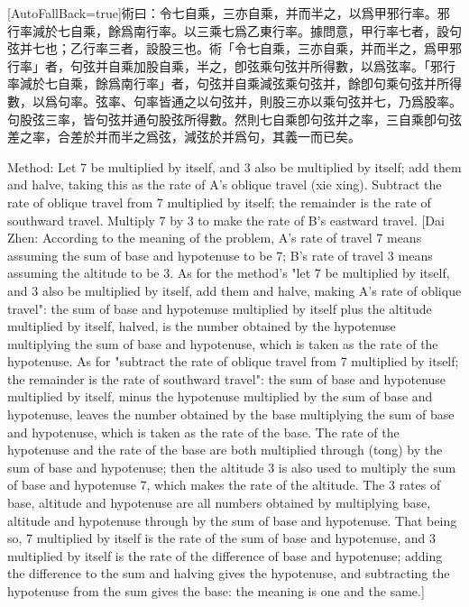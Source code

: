 \documentclass[11pt]{article}
\newcommand{\zhsmall}{\footnotesize\color{black!70}}
\newcommand{\unitlabel}[1]{\marginpar{\raggedleft\tiny\color{gray}#1}}
\newenvironment{unitzh}{\par\CJKfontspec{Noto Serif CJK SC}[AutoFallBack=true]\large\linespread{1.25}\selectfont}{\par}
\newenvironment{uniten}{\par\small\color{black!85}}{\par\medskip}
\begin{document}
\begin{unitzh}\unitlabel{jiuzhang-041.21}術曰：令七自乘，三亦自乘，并而半之，以爲甲邪行率。邪行率減於七自乘，餘爲南行率。以三乘七爲乙東行率。{\zhsmall 據問意，甲行率七者，設句弦并七也；乙行率三者，設股三也。術「令七自乘，三亦自乘，并而半之，爲甲邪行率」者，句弦并自乘加股自乘，半之，卽弦乘句弦并所得數，以爲弦率。「邪行率減於七自乘，餘爲南行率」者，句弦并自乘減弦乘句弦并，餘卽句乘句弦并所得數，以爲句率。弦率、句率皆通之以句弦并，則股三亦以乘句弦并七，乃爲股率。句股弦三率，皆句弦并通句股弦所得數。然則七自乘卽句弦并之率，三自乘卽句弦差之率，合差於并而半之爲弦，減弦於并爲句，其義一而已矣。}\end{unitzh}
\begin{uniten}Method: Let 7 be multiplied by itself, and 3 also be multiplied by itself; add them and halve, taking this as the rate of A's oblique travel (xie xing). Subtract the rate of oblique travel from 7 multiplied by itself; the remainder is the rate of southward travel. Multiply 7 by 3 to make the rate of B's eastward travel. [Dai Zhen: According to the meaning of the problem, A's rate of travel 7 means assuming the sum of base and hypotenuse to be 7; B's rate of travel 3 means assuming the altitude to be 3. As for the method's "let 7 be multiplied by itself, and 3 also be multiplied by itself, add them and halve, making A's rate of oblique travel": the sum of base and hypotenuse multiplied by itself plus the altitude multiplied by itself, halved, is the number obtained by the hypotenuse multiplying the sum of base and hypotenuse, which is taken as the rate of the hypotenuse. As for "subtract the rate of oblique travel from 7 multiplied by itself; the remainder is the rate of southward travel": the sum of base and hypotenuse multiplied by itself, minus the hypotenuse multiplied by the sum of base and hypotenuse, leaves the number obtained by the base multiplying the sum of base and hypotenuse, which is taken as the rate of the base. The rate of the hypotenuse and the rate of the base are both multiplied through (tong) by the sum of base and hypotenuse; then the altitude 3 is also used to multiply the sum of base and hypotenuse 7, which makes the rate of the altitude. The 3 rates of base, altitude and hypotenuse are all numbers obtained by multiplying base, altitude and hypotenuse through by the sum of base and hypotenuse. That being so, 7 multiplied by itself is the rate of the sum of base and hypotenuse, and 3 multiplied by itself is the rate of the difference of base and hypotenuse; adding the difference to the sum and halving gives the hypotenuse, and subtracting the hypotenuse from the sum gives the base: the meaning is one and the same.]\end{uniten}
\end{document}
